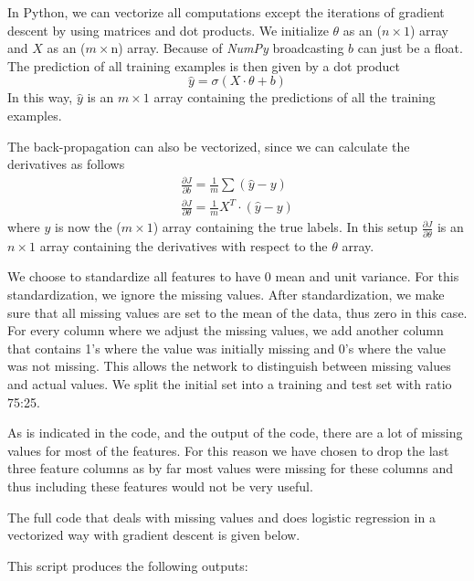 In Python, we can vectorize all computations except the iterations of gradient descent by using matrices and dot products. We initialize $\theta$ as an ($n\times 1$) array and $X$ as an ($m\times$n) array. Because of \textit{NumPy} broadcasting $b$ can just be a float. The prediction of all training examples is then given by a dot product
\begin{equation}
\hat{y} = \sigma(X\cdot\theta + b)
\end{equation}
In this way, $\hat{y}$ is an $m\times 1$ array containing the predictions of all the training examples.

The back-propagation can also be vectorized, since we can calculate the derivatives as follows
\begin{equation}
\begin{split}
\frac{\partial J}{\partial b} = \frac{1}{m} \sum (\hat{y} - y) \\
\frac{\partial J}{\partial \theta} = \frac{1}{m} X^T \cdot (\hat{y}-y)
\end{split}
\end{equation}
where $y$ is now the ($m\times 1$) array containing the true labels. In this setup $\frac{\partial J}{\partial \theta}$ is an $n\times 1$ array containing the derivatives with respect to the $\theta$ array. 

We choose to standardize all features to have 0 mean and unit variance. For this standardization, we ignore the missing values. After standardization, we make sure that all missing values are set to the mean of the data, thus zero in this case. For every column where we adjust the missing values, we add another column that contains 1's where the value was initially missing and 0's where the value was not missing. This allows the network to distinguish between missing values and actual values. We split the initial set into a training and test set with ratio 75:25. 

As is indicated in the code, and the output of the code, there are a lot of missing values for most of the features. For this reason we have chosen to drop the last three feature columns as by far most values were missing for these columns and thus including these features would not be very useful. 

The full code that deals with missing values and does logistic regression in a vectorized way with gradient descent is given below.



This script produces the following outputs:



